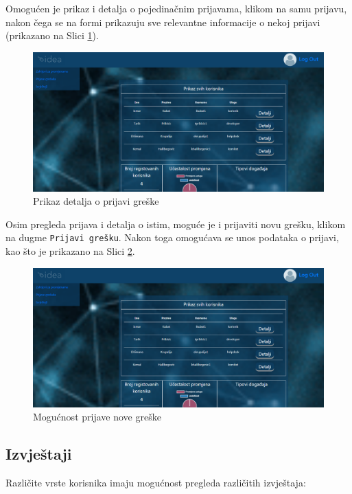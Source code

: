 \documentclass[12pt,a4paper]{article}
\begin{document}
Omogućen je prikaz i detalja o pojedinačnim prijavama, klikom na samu prijavu, nakon čega se na formi prikazuju sve relevantne informacije o nekoj prijavi (prikazano na Slici \ref{s13}).

\begin{figure}[H]
\center
\includegraphics[scale=0.35]{../res/UI/report1.PNG}
\caption{Prikaz detalja o prijavi greške}
\label{s13}
\end{figure}

Osim pregleda prijava i detalja o istim, moguće je i prijaviti novu grešku, klikom na dugme \texttt{Prijavi grešku}. Nakon toga omogućava se unos podataka o prijavi, kao što je prikazano na Slici \ref{s14}.

\begin{figure}[H]
\center
\includegraphics[scale=0.35]{../res/UI/report1.PNG}
\caption{Mogućnost prijave nove greške}
\label{s14}
\end{figure}

\newpage

\subsection{Izvještaji}

Različite vrste korisnika imaju mogućnost pregleda različitih izvještaja:
\end{document}

